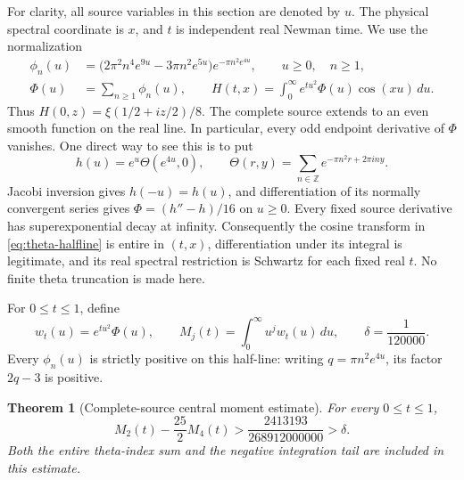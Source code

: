 \documentclass[11pt]{article}
\numberwithin{equation}{section}
\newtheorem{theorem}{Theorem}[section]
\theoremstyle{definition}
\theoremstyle{remark}
\begin{document}
For clarity, all source variables in this section are denoted by \(u\).
The physical spectral coordinate is \(x\), and \(t\) is independent
real Newman time.  We use the normalization
\begin{align}
 \phi_n(u)&=\bigl(2\pi^2n^4e^{9u}-3\pi n^2e^{5u}\bigr)
                 e^{-\pi n^2e^{4u}}, \qquad u\geq0,\quad n\geq1,
 \label{eq:theta-summands}\\
 \Phi(u)&=\sum_{n\geq1}\phi_n(u),\qquad
 H(t,x)=\int_0^\infty e^{tu^2}\Phi(u)\cos(xu)\,du .
 \label{eq:theta-halfline}
\end{align}
Thus \(H(0,z)=\xi(1/2+iz/2)/8\).  The complete source extends to an
even smooth function on the real line.  In particular, every odd
endpoint derivative of \(\Phi\) vanishes.  One direct way to see this
is to put
\[
 h(u)=e^u\Theta(e^{4u},0),\qquad
 \Theta(r,y)=\sum_{n\in\mathbb Z}e^{-\pi n^2r+2\pi iny}.
\]
Jacobi inversion gives \(h(-u)=h(u)\), and differentiation of its
normally convergent series gives
\(\Phi=(h''-h)/16\) on \(u\geq0\).
Every fixed source derivative has superexponential decay at infinity.
Consequently the cosine transform in \eqref{eq:theta-halfline} is
entire in \((t,x)\), differentiation under its integral is legitimate,
and its real spectral restriction is Schwartz for each fixed real \(t\).
No finite theta truncation is made here.

For \(0\leq t\leq1\), define
\[
 w_t(u)=e^{tu^2}\Phi(u),\qquad
 M_j(t)=\int_0^\infty u^jw_t(u)\,du,\qquad
 \delta=\frac1{120000}.
\]
Every \(\phi_n(u)\) is strictly positive on this half-line:
writing \(q=\pi n^2e^{4u}\), its factor \(2q-3\) is positive.

\begin{theorem}[Complete-source central moment estimate]
\label{thm:central-moment}
For every \(0\leq t\leq1\),
\begin{equation}
 M_2(t)-\frac{25}{2}M_4(t)>
 \frac{2413193}{268912000000}>\delta .
 \label{eq:central-moment}
\end{equation}
Both the entire theta-index sum and the negative integration tail are
included in this estimate.
\end{theorem}
\end{document}
